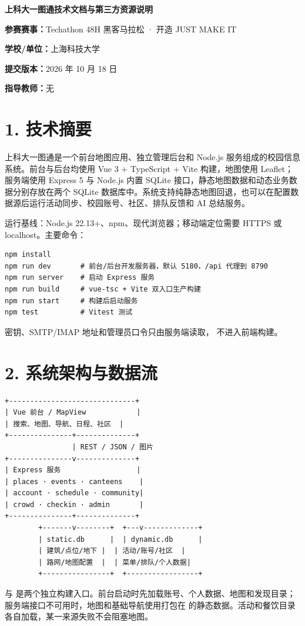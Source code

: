 \documentclass[UTF8,a4paper,12pt]{ctexart}
\begin{document}
\begin{center}\Huge\bfseries\color{ShanghaiBlue}上科大一图通技术文档与第三方资源说明\end{center}
\vspace{0.8em}
\textbf{参赛赛事：}Techathon 48H 黑客马拉松 · 开造 JUST MAKE IT\par
\textbf{学校/单位：}上海科技大学\par
\textbf{提交版本：}2026 年 10 月 18 日\par
\textbf{指导教师：}无\par
\section{1. 技术摘要}
上科大一图通是一个前台地图应用、独立管理后台和 Node.js 服务组成的校园信息系统。前台与后台均使用 Vue 3 + TypeScript + Vite 构建，地图使用 Leaflet；服务端使用 Express 5 与 Node.js 内置 SQLite 接口，静态地图数据和动态业务数据分别存放在两个 SQLite 数据库中。系统支持纯静态地图回退，也可以在配置数据源后运行活动同步、校园账号、社区、排队反馈和 AI 总结服务。\par
运行基线：Node.js 22.13+、npm、现代浏览器；移动端定位需要 HTTPS 或 localhost。主要命令：\par
\begin{lstlisting}
npm install
npm run dev       # 前台/后台开发服务器，默认 5180，/api 代理到 8790
npm run server    # 启动 Express 服务
npm run build     # vue-tsc + Vite 双入口生产构建
npm run start     # 构建后启动服务
npm test          # Vitest 测试
\end{lstlisting}
密钥、SMTP/IMAP 地址和管理员口令只由服务端读取，\texttt{} 不进入前端构建。\par
\section{2. 系统架构与数据流}
\begin{lstlisting}
+------------------------------+
| Vue 前台 / MapView            |
| 搜索、地图、导航、日程、社区  |
+---------------+--------------+
                | REST / JSON / 图片
+---------------v--------------+
| Express 服务                  |
| places · events · canteens    |
| account · schedule · community|
| crowd · checkin · admin       |
+---------------+--------------+
        +-------v--------+  +---v-------------+
        | static.db      |  | dynamic.db      |
        | 建筑/点位/地下 |  | 活动/账号/社区  |
        | 路网/地图配置  |  | 菜单/排队/个人数据|
        +----------------+  +-----------------+
\end{lstlisting}
\texttt{} 与 \texttt{} 是两个独立构建入口。前台启动时先加载账号、个人数据、地图和发现目录；服务端接口不可用时，地图和基础导航使用打包在 \texttt{} 的静态数据。活动和餐饮目录各自加载，某一来源失败不会阻塞地图。\par
\end{document}
